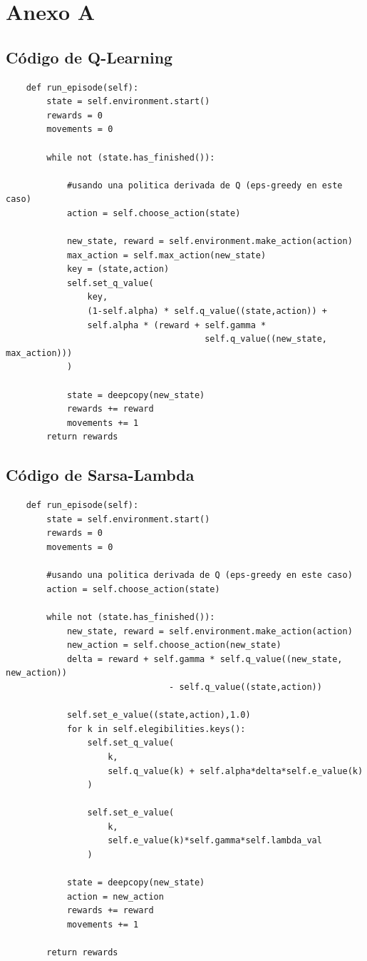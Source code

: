 \documentclass[11pt, a4paper]{article}
\begin{document}
\newpage

\section{Anexo A}
\subsection{Código de Q-Learning}
\begin{verbatim}
    def run_episode(self):
        state = self.environment.start()
        rewards = 0
        movements = 0
        
        while not (state.has_finished()):
            
            #usando una politica derivada de Q (eps-greedy en este caso)
            action = self.choose_action(state)
            
            new_state, reward = self.environment.make_action(action)
            max_action = self.max_action(new_state)
            key = (state,action)
            self.set_q_value(
                key, 
                (1-self.alpha) * self.q_value((state,action)) + 
                self.alpha * (reward + self.gamma * 
                                       self.q_value((new_state, max_action)))
            )
            
            state = deepcopy(new_state)
            rewards += reward
            movements += 1
        return rewards
\end{verbatim}


\subsection{Código de Sarsa-Lambda}
\begin{verbatim}
    def run_episode(self):
        state = self.environment.start()
        rewards = 0
        movements = 0
        
        #usando una politica derivada de Q (eps-greedy en este caso)
        action = self.choose_action(state)
                
        while not (state.has_finished()):
            new_state, reward = self.environment.make_action(action)
            new_action = self.choose_action(new_state)
            delta = reward + self.gamma * self.q_value((new_state, new_action)) 
                                - self.q_value((state,action))
            
            self.set_e_value((state,action),1.0)
            for k in self.elegibilities.keys():
                self.set_q_value(
                    k, 
                    self.q_value(k) + self.alpha*delta*self.e_value(k)
                )
                
                self.set_e_value(
                    k, 
                    self.e_value(k)*self.gamma*self.lambda_val
                )

            state = deepcopy(new_state)
            action = new_action
            rewards += reward
            movements += 1
        
        return rewards
\end{verbatim}
\end{document}
